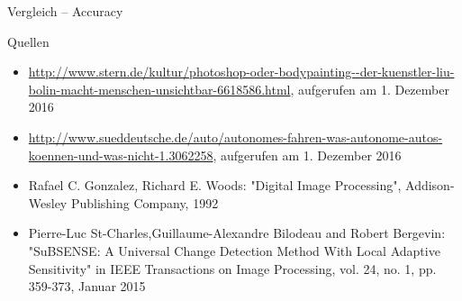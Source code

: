 \documentclass[hyperref={pdfpagelabels=false}]{beamer}
\begin{document}
\begin{frame}[t]{Vergleich -- Accuracy}

	\begin{figure}[htpb]
		\centering
	\end{figure}
	
\end{frame}



\begin{frame}[t]{Quellen}
	\begin{itemize}
		\item \url{http://www.stern.de/kultur/photoshop-oder-bodypainting--der-kuenstler-liu-bolin-macht-menschen-unsichtbar-6618586.html}, aufgerufen am 1. Dezember 2016
		\item \url{http://www.sueddeutsche.de/auto/autonomes-fahren-was-autonome-autos-koennen-und-was-nicht-1.3062258}, aufgerufen am 1. Dezember 2016
		\item Rafael C. Gonzalez, Richard E. Woods: "Digital Image Processing", Addison-Wesley Publishing Company, 1992
		\item Pierre-Luc St-Charles,Guillaume-Alexandre Bilodeau and Robert Bergevin: "SuBSENSE: A Universal Change Detection Method With Local Adaptive Sensitivity" in IEEE Transactions on Image Processing, vol. 24, no. 1, pp. 359-373, Januar 2015
	\end{itemize}
\end{frame}
\end{document}
